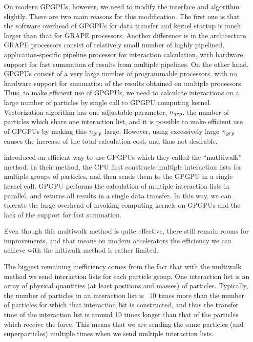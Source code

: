 \documentclass[dvipdfmx]{pasj01}
\begin{document}
On modern GPGPUs, however, we need to modify the interface and
algorithm slightly. There are two main reasons for this
modification. The first one is that the software overhead of GPGPUs
for data transfer and kernel startup is much larger than that for
GRAPE processors. Another difference is in the architecture.  GRAPE
processors consist of relatively small number of highly pipelined,
application-specific pipeline processor for interaction calculation,
with hardware support for fast summation of results from multiple
pipelines. On the other hand, GPGPUs consist of a very large number of
programmable processors, with no hardware support for summation of the
results obtained on multiple processors. Thus, to make efficient use
of GPGPUs, we need to calculate interactions on a large number of
particles by single call to GPGPU computing kernel.  Vectorization
algorithm has one adjustable parameter, $n_{\rm grp}$, the number of
particles which share one interaction list, and it is possible to make
efficient use of GPGPUs by making this $n_{\rm grp}$ large. However,
using excessively large $n_{\rm grp}$ causes the increase of the total
calculation cost, and thus not desirable.

\citet{Hamadaetal2009} introduced an efficient way to use GPGPUs which
they called the ``mutltiwalk'' method. In their method, the CPU first
constructs multiple interaction lists for multiple groups of
particles, and then sends them to the GPGPU in a single kernel
call. GPGPU performs the calculation of multiple interaction lists in
parallel, and returns all results in a single data transfer. In this
way, we can tolerate the large overhead of invoking computing kernels
on GPGPUs and the lack of the support for fast summation.

Even though this multiwalk method is quite effective, there still
remain rooms for improvements, and that means on modern accelerators
the efficiency we can achieve with the mltiwalk method is rather
limited.

The biggest remaining inefficiency comes from the fact that with the
multiwalk method we send interaction lists for each particle group.
One interaction list is an array of physical quantities (at least
positions and masses) of particles. Typically, the number of particles
in an interaction list is ~10 times more than the number of particles
for which that interaction list is constructed, and thus the transfer
time of the interaction list is around 10 times longer than that of
the particles which receive the force. This means that we are sending
the same particles (and superparticles) multiple times when we send
multiple interaction lists.
\end{document}
